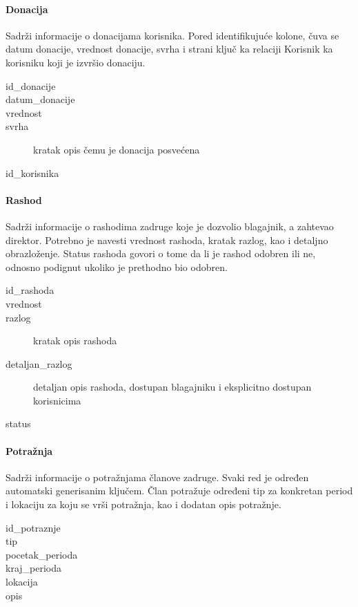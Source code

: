 \documentclass[a4paper, oneside]{article}
\begin{document}
\paragraph{Donacija} Sadrži informacije o donacijama korisnika. Pored identifikujuće kolone, čuva se datum donacije, vrednost donacije, svrha i strani ključ ka relaciji Korisnik ka korisniku koji je izvršio donaciju.
\begin{description}
    \item[id\_donacije]
    \item[datum\_donacije]
    \item[vrednost]
    \item[svrha] kratak opis čemu je donacija posvećena
    \item[id\_korisnika]
\end{description}
\paragraph{Rashod} Sadrži informacije o rashodima zadruge koje je dozvolio blagajnik, a zahtevao direktor. Potrebno je navesti vrednost rashoda, kratak razlog, kao i detaljno obrazloženje. Status rashoda govori o tome da li je rashod odobren ili ne, odnosno podignut ukoliko je prethodno bio odobren.
\begin{description}
    \item[id\_rashoda]
    \item[vrednost]
    \item[razlog] kratak opis rashoda
    \item[detaljan\_razlog] detaljan opis rashoda, dostupan blagajniku i eksplicitno dostupan korisnicima
    \item[status] 
\end{description}
\paragraph{Potražnja} Sadrži informacije o potražnjama članove zadruge. Svaki red je određen automatski generisanim ključem. Član potražuje određeni tip za konkretan period i lokaciju za koju se vrši potražnja, kao i dodatan opis potražnje.
\begin{description}
    \item[id\_potraznje]
    \item[tip] 
    \item[pocetak\_perioda]
    \item[kraj\_perioda]
    \item[lokacija]
    \item[opis]
\end{description}
\end{document}

